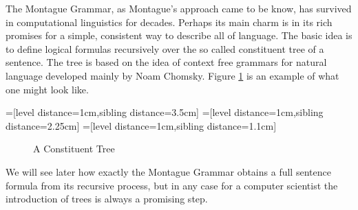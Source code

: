 \documentclass[12pt]{article}
\begin{document}
The Montague Grammar, as Montague's approach came to be know, has survived in computational linguistics for decades. Perhaps its main charm is in its rich promises for a simple, consistent way to describe all of language. The basic idea is to define logical formulas recursively over the so called constituent tree of a sentence. The tree is based on the idea of context free grammars for natural language developed mainly by Noam Chomsky\cite{chomsky2002syntactic}. Figure \ref{fig:const_tree} is an example of what one might look like.

=[level distance=1cm,sibling distance=3.5cm]
=[level distance=1cm,sibling distance=2.25cm]
=[level distance=1cm,sibling distance=1.1cm]
\begin{figure}
\centering
{}
\caption{A Constituent Tree} \label{fig:const_tree}
\end{figure}

We will see later how exactly the Montague Grammar obtains a full sentence formula from its recursive process, but in any case for a computer scientist the introduction of trees is always a promising step.
\end{document}
